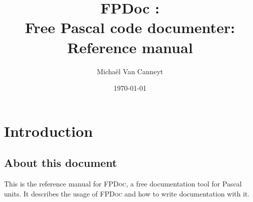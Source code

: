 %
%
%
%
%

%
%
\makeindex
%
%
\newcommand{\fpdoc}{\textsc{FPDoc}\xspace}
\newcommand{\seesu}[1]{section \ref{suse:#1}, page \pageref{suse:#1}\xspace}
\newcommand{\seetag}[1]{\tag{#1} (\pageref{tag:#1})\xspace}
\newcommand{\tag}[1]{\textbf{#1}}
\newcommand{\attr}[1]{\textit{#1}}
\usepackage{tabularx}
\usepackage{syntax}

\title{FPDoc :\\Free Pascal code documenter: Reference manual}
\date{\today}
\author{Micha\"el Van Canneyt}
\maketitle
\tableofcontents

\chapter{Introduction}

\section{About this document}
This is the reference manual for \fpdoc, a free documentation tool for 
Pascal units. It describes the usage of \fpdoc and how to write 
documentation with it. 

